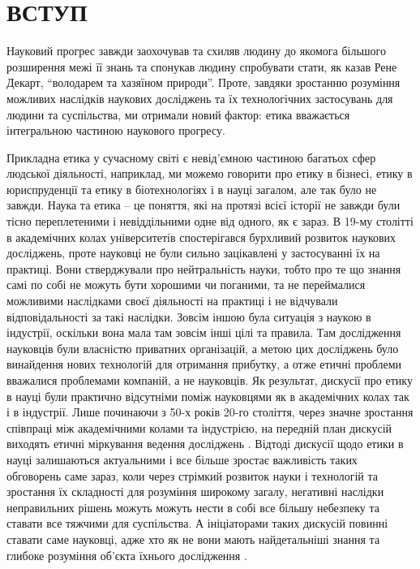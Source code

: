 \section*{ВСТУП}


Науковий прогрес завжди заохочував та схиляв людину до якомога більшого розширення межі її знань та спонукав людину спробувати стати, як казав Рене Декарт, \foreignquote{ukrainian}{володарем та хазяїном природи}. Проте, завдяки зростанню розуміння можливих наслідків наукових досліджень та їх технологічних застосувань для людини та суспільства, ми отримали новий фактор: етика вважається інтегральною частиною наукового прогресу.

Прикладна етика у сучасному світі є невід'ємною частиною багатьох сфер людської діяльності, наприклад, ми можемо говорити про етику в бізнесі, етику в юриспруденції та етику в біотехнологіях і в науці загалом, але так було не завжди. Наука та етика – це поняття, які на протязі всієї історії не завжди були тісно переплетеними і невіддільними одне від одного, як є зараз. В 19-му столітті в академічних колах університетів спостерігався бурхливий розвиток наукових досліджень, проте науковці не були сильно зацікавлені у застосуванні їх на практиці. Вони стверджували про нейтральність науки, тобто про те що знання самі по собі не можуть бути хорошими чи поганими, та не переймалися можливими наслідками своєї діяльності на практиці і не відчували відповідальності за такі наслідки. Зовсім іншою була ситуація з наукою в індустрії, оскільки вона мала там зовсім інші цілі та правила. Там дослідження науковців були власністю приватних організацій, а метою цих досліджень було винайдення нових технологій для отримання прибутку, а отже етичні проблеми вважалися проблемами компаній, а не науковців. Як результат, дискусії про етику в науці були практично відсутніми поміж науковцями як в академічних колах так і в індустрії. Лише починаючи з 50-х років 20-го століття, через значне зростання співпраці між академічними колами та індустрією, на передній план дискусій виходять етичні міркування ведення досліджень \cite{Iaccarino2001-ju}. Відтоді дискусії щодо етики в науці залишаються актуальними і все більше зростає важливість таких обговорень саме зараз, коли через стрімкий розвиток науки і технологій та зростання їх складності для розуміння широкому загалу, негативні наслідки неправильних рішень  можуть можуть нести в собі все більшу небезпеку та ставати все тяжчими для суспільства. А ініціаторами таких дискусій повинні ставати саме науковці, адже хто як не вони мають найдетальніші знання та глибоке розуміння об'єкта їхнього дослідження \cite{Copland2003-xt}\cite{Iaccarino2001-ju}.


